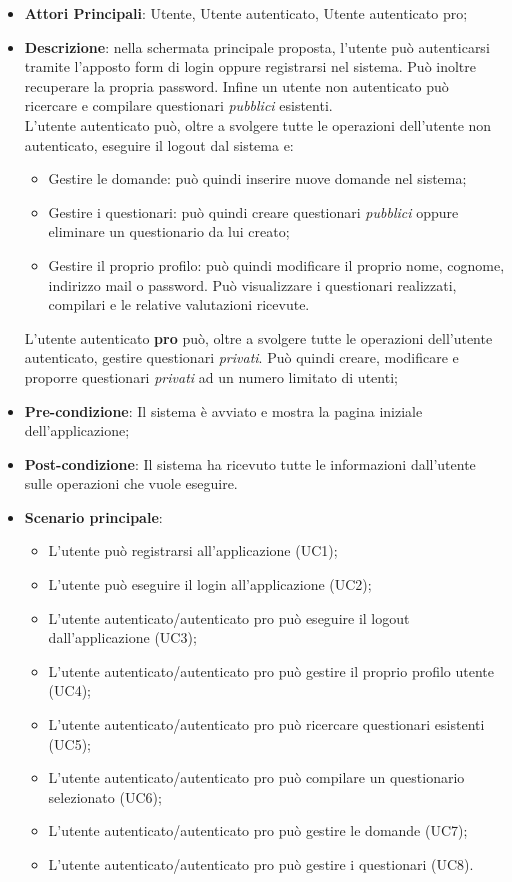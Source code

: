 \begin{itemize}
\item\textbf{Attori Principali}: Utente, Utente autenticato, Utente autenticato pro;
\item\textbf{Descrizione}: nella schermata principale proposta, l'utente può autenticarsi tramite l'apposto form di login oppure registrarsi nel sistema. Può inoltre recuperare la propria password. Infine un utente non autenticato può ricercare e compilare questionari \textit{pubblici} esistenti.\\
L'utente autenticato può, oltre a svolgere tutte le operazioni dell'utente non autenticato, eseguire il logout dal sistema e:
\begin{itemize}
\item Gestire le domande: può quindi inserire nuove domande nel sistema;
\item Gestire i questionari: può quindi creare questionari \textit{pubblici} oppure eliminare un questionario da lui creato;
\item Gestire il proprio profilo: può quindi modificare il proprio nome, cognome, indirizzo mail o password. Può visualizzare i questionari realizzati, compilari e le relative valutazioni ricevute.
\end{itemize}
L'utente autenticato \textbf{pro} può, oltre a svolgere tutte le operazioni dell'utente autenticato, gestire questionari \textit{privati}. Può quindi creare, modificare e proporre questionari \textit{privati} ad un numero limitato di utenti;
\item\textbf{Pre-condizione}: Il sistema è avviato e mostra la pagina iniziale dell'applicazione;
\item\textbf{Post-condizione}: Il sistema ha ricevuto tutte le informazioni dall'utente sulle operazioni che vuole eseguire.
\item\textbf{Scenario principale}:
\begin{itemize}
\item L'utente può registrarsi all'applicazione (UC1);
\item L'utente può eseguire il login all'applicazione (UC2);
\item L'utente autenticato/autenticato pro può eseguire il logout dall'applicazione (UC3); 
\item L'utente autenticato/autenticato pro può gestire il proprio profilo utente (UC4);
\item L'utente autenticato/autenticato pro può ricercare questionari esistenti (UC5);
\item L'utente autenticato/autenticato pro può compilare un questionario  selezionato (UC6);
\item L'utente autenticato/autenticato pro può gestire le domande (UC7);
\item L'utente autenticato/autenticato pro può gestire i questionari (UC8).
\end{itemize}
\end{itemize}